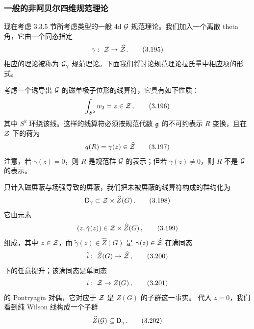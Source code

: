 

\subsubsection{一般的非阿贝尔四维规范理论}

现在考虑 3.3.5 节所考虑类型的一般 4d $\mathcal{G}$ 规范理论。我们加入一个离散 theta 角，它由一个同态指定
\begin{equation}
    \gamma:\ \mathcal{Z} \to \widehat{\mathcal{Z}} \,.
    \tag{3.195}
\end{equation}
相应的理论被称为 $\mathcal{G}_\gamma$ 规范理论。下面我们将讨论规范理论拉氏量中相应项的形式。

考虑一个诱导出 $\mathcal{G}$ 的磁单极子位形的线算符，它具有如下性质：
\begin{equation}
    \int_{S^2} w_2 = z \in \mathcal{Z} \,,
    \tag{3.196}
\end{equation}
其中 $S^2$ 环绕该线。这样的线算符必须按规范代数 $\mathfrak{g}$ 的不可约表示 $R$ 变换，且在 $\mathcal{Z}$ 下的荷为
\begin{equation}
    q(R) = \gamma(z) \in \widehat{\mathcal{Z}}
    \tag{3.197}
\end{equation}
注意，若 $\gamma(z) = 0$，则 $R$ 是规范群 $\mathcal{G}$ 的表示；但若 $\gamma(z) \neq 0$，则 $R$ 不是 $\mathcal{G}$ 的表示。

只计入磁屏蔽与场强导致的屏蔽，我们把未被屏蔽的线算符构成的群约化为
\begin{equation}
    \mathsf{D}_\gamma \subset \mathcal{Z} \times \widehat{Z}(G) \,.
    \tag{3.198}
\end{equation}
它由元素
\begin{equation}
    (z, \tilde{\gamma}(z)) \in \mathcal{Z} \times \widehat{Z}(G) \,,
    \tag{3.199}
\end{equation}
组成，其中 $z \in \mathcal{Z}$，而 $\tilde{\gamma}(z) \in \widehat{Z}(G)$ 是 $\gamma(z) \in \widehat{\mathcal{Z}}$ 在满同态
\begin{equation}
    \hat{i}:\ \widehat{Z}(G) \to \widehat{\mathcal{Z}} \,,
    \tag{3.200}
\end{equation}
下的任意提升；该满同态是单同态
\begin{equation}
    i:\ \mathcal{Z} \to Z(G) \,,
    \tag{3.201}
\end{equation}
的 Pontryagin 对偶，它对应于 $\mathcal{Z}$ 是 $Z(G)$ 的子群这一事实。
代入 $z = 0$，我们看到纯 Wilson 线构成一个子群
\begin{equation}
    \widehat{Z}(\mathcal{G}) \subseteq \mathsf{D}_\gamma \,.
    \tag{3.202}
\end{equation}

